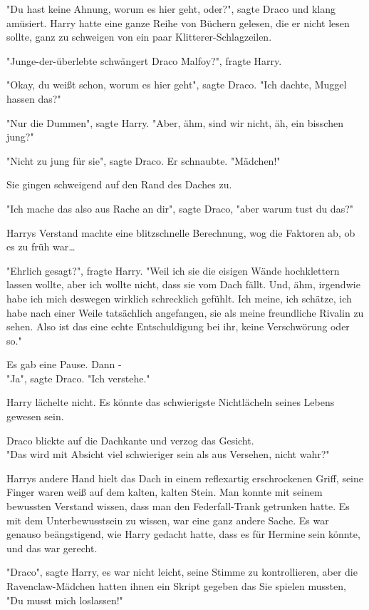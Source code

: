 {"Du hast keine Ahnung, worum es hier geht, oder?", sagte Draco und klang amüsiert. Harry hatte eine ganze Reihe von Büchern gelesen, die er nicht lesen sollte, ganz zu schweigen von ein paar Klitterer-Schlagzeilen.

"Junge-der-überlebte schwängert Draco Malfoy?", fragte Harry.

"Okay, du weißt schon, worum es hier geht", sagte Draco. "Ich dachte, Muggel hassen das?"

"Nur die Dummen", sagte Harry. "Aber, ähm, sind wir nicht, äh, ein bisschen jung?"

"Nicht zu jung für sie", sagte Draco. Er schnaubte. "Mädchen!"

Sie gingen schweigend auf den Rand des Daches zu.

"Ich mache das also aus Rache an dir", sagte Draco, "aber warum tust du das?"

Harrys Verstand machte eine blitzschnelle Berechnung, wog die Faktoren ab, ob es zu früh war…

"Ehrlich gesagt?", fragte Harry. "Weil ich sie die eisigen Wände hochklettern lassen wollte, aber ich wollte nicht, dass sie vom Dach fällt. Und, ähm, irgendwie habe ich mich deswegen wirklich schrecklich gefühlt. Ich meine, ich schätze, ich habe nach einer Weile tatsächlich angefangen, sie als meine freundliche Rivalin zu sehen. Also ist das eine echte Entschuldigung bei ihr, keine Verschwörung oder so."

Es gab eine Pause. Dann -\\ "Ja", sagte Draco. "Ich verstehe."

Harry lächelte nicht. Es könnte das schwierigste Nichtlächeln seines Lebens gewesen sein.

Draco blickte auf die Dachkante und verzog das Gesicht.\\ "Das wird mit Absicht viel schwieriger sein als aus Versehen, nicht wahr?"

Harrys andere Hand hielt das Dach in einem reflexartig erschrockenen Griff, seine Finger waren weiß auf dem kalten, kalten Stein. Man konnte mit seinem bewussten Verstand wissen, dass man den Federfall-Trank getrunken hatte. Es mit dem Unterbewusstsein zu wissen, war eine ganz andere Sache. Es war genauso beängstigend, wie Harry gedacht hatte, dass es für Hermine sein könnte, und das war gerecht.

"Draco", sagte Harry, es war nicht leicht, seine Stimme zu kontrollieren, aber die Ravenclaw-Mädchen hatten ihnen ein Skript gegeben das Sie spielen mussten, "Du musst mich loslassen!"

}
